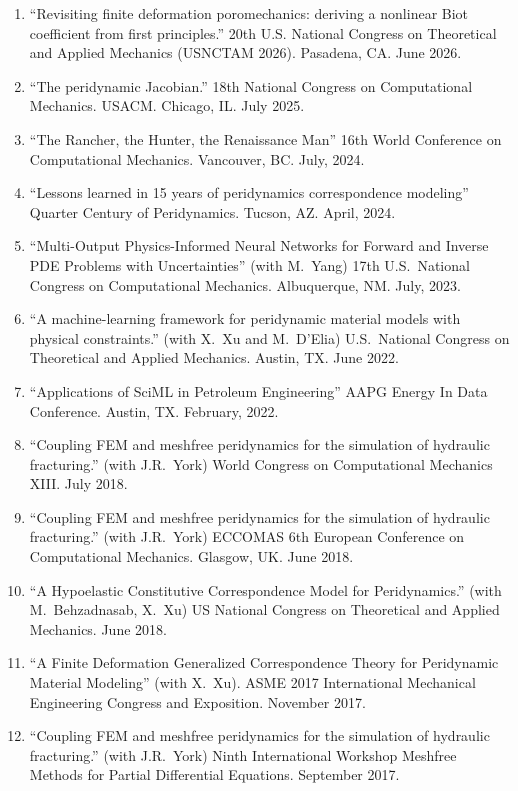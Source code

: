 \begin{etaremune}
\else
\begin{enumerate}
\fi
    \item ``Revisiting finite deformation poromechanics: deriving a nonlinear Biot coefficient from first principles.'' 20th U.S. National Congress on Theoretical and Applied Mechanics (USNCTAM 2026). Pasadena, CA. June 2026.
    \item ``The peridynamic Jacobian.'' 18th National Congress on Computational Mechanics. USACM. Chicago, IL. July 2025.
    \item ``The Rancher, the Hunter, the Renaissance Man''  16th World Conference on Computational Mechanics. Vancouver, BC.  July, 2024.
    \item ``Lessons learned in 15 years of peridynamics correspondence modeling''  Quarter Century of Peridynamics. Tucson, AZ.  April, 2024.
    \item ``Multi-Output Physics-Informed Neural Networks for Forward and Inverse PDE Problems with Uncertainties'' (with M.\ Yang)  17th U.S.\ National Congress on Computational Mechanics. Albuquerque, NM.  July, 2023.
    \item ``A machine-learning framework for peridynamic material models with physical constraints.'' (with X.\ Xu and M.\ D'Elia) U.S.\ National Congress on Theoretical and Applied Mechanics. Austin, TX.  June 2022.
    \item ``Applications of SciML in Petroleum Engineering''  AAPG Energy In Data Conference. Austin, TX.  February, 2022.
    \item ``Coupling FEM and meshfree peridynamics for the simulation of hydraulic fracturing.'' (with J.R.\ York) World Congress on Computational Mechanics XIII. July 2018.
    \item ``Coupling FEM and meshfree peridynamics for the simulation of hydraulic fracturing.'' (with J.R.\ York) ECCOMAS 6th European Conference on Computational Mechanics. Glasgow, UK. June 2018.
    \item ``A Hypoelastic Constitutive Correspondence Model for Peridynamics.'' (with M.\ Behzadnasab, X.\ Xu) US National Congress on Theoretical and Applied Mechanics. June 2018.
    \item ``A Finite Deformation Generalized Correspondence Theory for Peridynamic Material Modeling'' (with X.\ Xu). ASME 2017 International Mechanical Engineering Congress and Exposition. November 2017.
    \item ``Coupling FEM and meshfree peridynamics for the simulation of hydraulic fracturing.'' (with J.R.\ York) Ninth International Workshop Meshfree Methods for Partial Differential Equations. September 2017.

\end{enumerate}
\end{etaremune}
